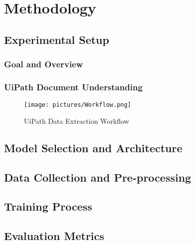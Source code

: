 \chapter{Methodology}

\section{Experimental Setup}
\subsection{Goal and Overview}
\subsection{UiPath Document Understanding}
\begin{figure}[ht]
    \centering 
    \texttt{[image: pictures/Workflow.png]}
    \caption{UiPath Data Extraction Workflow}
    \label{pic:UiPath_1}    %
\end{figure}
\section{Model Selection and Architecture}
\section{Data Collection and Pre-processing}
\section{Training Process}
\section{Evaluation Metrics}